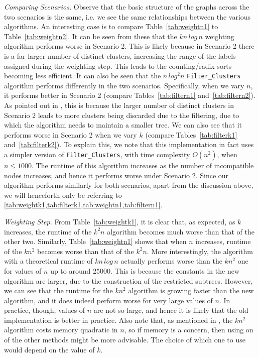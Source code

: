 \documentclass[12pt,a4paper]{article}
\begin{document}
    \textit{Comparing Scenarios.} Observe that the basic structure of the graphs across the two scenarios is the same, i.e. we see the same relationships between the various algorithms. An interesting case is to compare Table~\ref{tab:weightn1} to Table~\ref{tab:weightn2}. It can be seen from these that the $kn\,log\,n$ weighting algorithm performs worse in Scenario 2. This is likely because in Scenario 2 there is a far larger number of distinct clusters, increasing the range of the labels assigned during the weighting step. This leads to the counting/radix sorts becoming less efficient. It can also be seen that the $n\,log^2n$ \texttt{Filter\_Clusters} algorithm performs differently in the two scenarios. Specifically, when we vary $n$, it performs better in Scenario 2 (compare Tables~\ref{tab:filtern1} and~\ref{tab:filtern2}). As pointed out in \cite{jansson2018algorithms}, this is because the larger number of distinct clusters in Scenario 2 leads to more clusters being discarded due to the filtering, due to which the algorithm needs to maintain a smaller tree. We can also see that it performs worse in Scenario 2 when we vary $k$ (compare Tables~\ref{tab:filterk1} and~\ref{tab:filterk2}). To explain this, we note that this implementation in fact uses a simpler version of \texttt{Filter\_Clusters}, with time complexity $O(n^2)$, when $n \leq 1000$. The runtime of this algorithm increases as the number of incompatible nodes increases, and hence it performs worse under Scenario 2. Since our algorithm performs similarly for both scenarios, apart from the discussion above, we will henceforth only be referring to \cref{tab:weightk1,tab:filterk1,tab:weightn1,tab:filtern1}.

    \textit{Weighting Step.} From Table~\ref{tab:weightk1}, it is clear that, as expected, as $k$ increases, the runtime of the $k^2n$ algorithm becomes much worse than that of the other two. Similarly, Table~\ref{tab:weightn1} shows that when $n$ increases, runtime of the $kn^2$ becomes worse than that of the $k^2n$. More interestingly, the algorithm with a theoretical runtime of $kn\,log\,n$ actually performs worse than the $kn^2$ one for values of $n$ up to around $25000$. This is because the constants in the new algorithm are larger, due to the construction of the restricted subtrees. However, we can see that the runtime for the $kn^2$ algorithm is growing faster than the new algorithm, and it does indeed perform worse for very large values of $n$. In practice, though, values of $n$ are not so large, and hence it is likely that the old implementation is better in practice. Also note that, as mentioned in \cite{jansson2018algorithms}, the $kn^2$ algorithm costs memory quadratic in $n$, so if memory is a concern, then using on of the other methods might be more advisable. The choice of which one to use would depend on the value of $k$.
\end{document}
